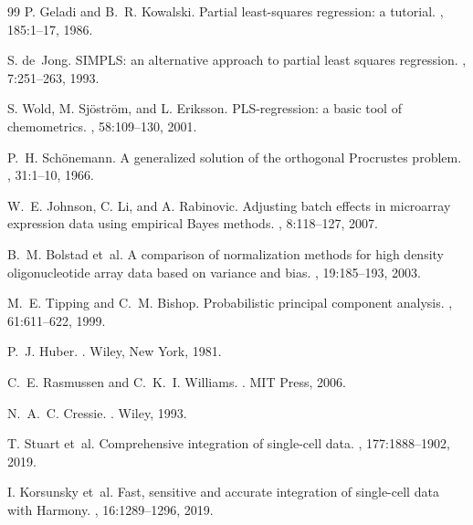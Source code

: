 \documentclass[11pt]{article}
\numberwithin{equation}{section}
\begin{document}
\begin{thebibliography}{99}
P. Geladi and B.~R. Kowalski.
\newblock Partial least-squares regression: a tutorial.
, 185:1--17, 1986.

S. de~Jong.
\newblock SIMPLS: an alternative approach to partial least squares regression.
, 7:251--263, 1993.

S. Wold, M. Sj\"ostr\"om, and L. Eriksson.
\newblock PLS-regression: a basic tool of chemometrics.
, 58:109--130, 2001.

P.~H. Sch\"onemann.
\newblock A generalized solution of the orthogonal Procrustes problem.
, 31:1--10, 1966.

W.~E. Johnson, C. Li, and A. Rabinovic.
\newblock Adjusting batch effects in microarray expression data using empirical Bayes
methods.
, 8:118--127, 2007.

B.~M. Bolstad et~al.
\newblock A comparison of normalization methods for high density oligonucleotide array
data based on variance and bias.
, 19:185--193, 2003.

M.~E. Tipping and C.~M. Bishop.
\newblock Probabilistic principal component analysis.
, 61:611--622, 1999.

P.~J. Huber.
.
\newblock Wiley, New York, 1981.

C.~E. Rasmussen and C.~K.~I. Williams.
.
\newblock MIT Press, 2006.

N.~A.~C. Cressie.
.
\newblock Wiley, 1993.

T. Stuart et~al.
\newblock Comprehensive integration of single-cell data.
, 177:1888--1902, 2019.

I. Korsunsky et~al.
\newblock Fast, sensitive and accurate integration of single-cell data with Harmony.
, 16:1289--1296, 2019.


\end{thebibliography}
\end{document}
